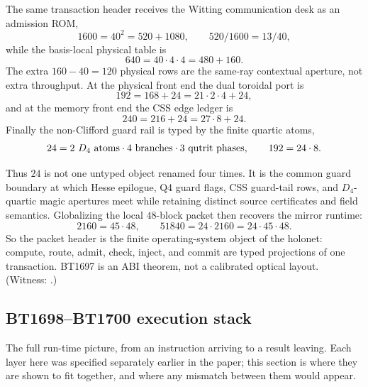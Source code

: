 \documentclass[11pt]{article}
\begin{document}
The same transaction header receives the Witting communication desk as an
admission ROM,
\[
  1600=40^2=520+1080,\qquad 520/1600=13/40,
\]
while the basis-local physical table is
\[
  640=40\cdot4\cdot4=480+160.
\]
The extra \(160-40=120\) physical rows are the same-ray contextual aperture,
not extra throughput.  At the physical front end the dual toroidal port is
\[
  192=168+24=21\cdot2\cdot4+24,
\]
and at the memory front end the CSS edge ledger is
\[
  240=216+24=27\cdot8+24.
\]
Finally the non-Clifford guard rail is typed by the finite quartic atoms,
\[
  24 = 2\ \hbox{\(D_4\) atoms}\cdot4\ \hbox{branches}\cdot3\ \hbox{qutrit phases},
  \qquad
  192=24\cdot8.
\]

Thus \(24\) is not one untyped object renamed four times.  It is the common
guard boundary at which Hesse epilogue, Q4 guard flags, CSS guard-tail rows, and
\(D_4\)-quartic magic apertures meet while retaining distinct source
certificates and field semantics.  Globalizing the local \(48\)-block packet
then recovers the mirror runtime:
\[
  2160=45\cdot48,\qquad
  51840=24\cdot2160=24\cdot45\cdot48.
\]
So the packet header is the finite operating-system object of the holonet:
compute, route, admit, check, inject, and commit are typed projections of one
transaction.  BT1697 is an ABI theorem, not a calibrated optical layout.
(Witness: .)

\subsection{BT1698--BT1700 execution stack}

\begin{plainbox}
The full run-time picture, from an instruction arriving to a result leaving. Each
layer here was specified separately earlier in the paper; this section is where they are
shown to fit together, and where any mismatch between them would appear.
\end{plainbox}
\end{document}
